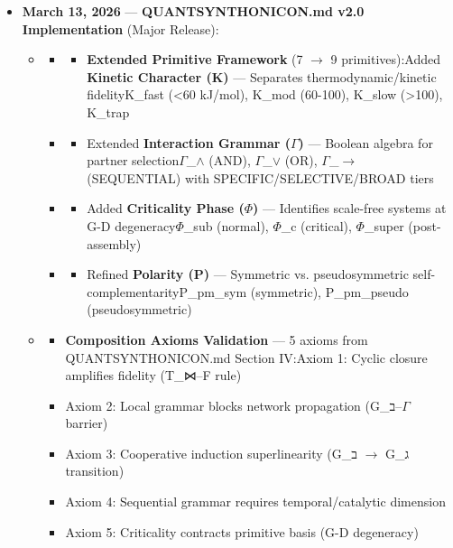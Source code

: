 \documentclass[12pt,a4paper]{article}
\begin{document}
\begin{itemize}
\begin{itemize}
\end{itemize}

    \item 
    \textbf{March 13, 2026} --- \textbf{QUANTSYNTHONICON.md v2.0 Implementation} (Major Release):

    \begin{itemize}
    \item 
    \begin{itemize}
    \item 
    \begin{itemize}
    \item \textbf{Extended Primitive Framework} (7 $\rightarrow$ 9 primitives):Added \textbf{Kinetic Character (K)} --- Separates thermodynamic/kinetic fidelityK\_fast (\textless{}60 kJ/mol), K\_mod (60-100), K\_slow (\textgreater{}100), K\_trap
\end{itemize}

    \item 
    \begin{itemize}
    \item Extended \textbf{Interaction Grammar ($\Gamma$)} --- Boolean algebra for partner selection$\Gamma$\_$\land$ (AND), $\Gamma$\_$\lor$ (OR), $\Gamma$\_$\rightarrow$ (SEQUENTIAL) with SPECIFIC/SELECTIVE/BROAD tiers
\end{itemize}

    \item 
    \begin{itemize}
    \item Added \textbf{Criticality Phase ($\Phi$)} --- Identifies scale-free systems at G-D degeneracy$\Phi$\_sub (normal), $\Phi$\_c (critical), $\Phi$\_super (post-assembly)
\end{itemize}

    \item 
    \begin{itemize}
    \item Refined \textbf{Polarity (P)} --- Symmetric vs. pseudosymmetric self-complementarityP\_pm\_sym (symmetric), P\_pm\_pseudo (pseudosymmetric)
\end{itemize}

\end{itemize}

    \item 
    \begin{itemize}
    \item \textbf{Composition Axioms Validation} --- 5 axioms from QUANTSYNTHONICON.md Section IV:Axiom 1: Cyclic closure amplifies fidelity (T\_⋈--F rule)
    \item Axiom 2: Local grammar blocks network propagation (G\_ב--$\Gamma$ barrier)
    \item Axiom 3: Cooperative induction superlinearity (G\_ב $\rightarrow$ G\_ג transition)
    \item Axiom 4: Sequential grammar requires temporal/catalytic dimension
    \item Axiom 5: Criticality contracts primitive basis (G-D degeneracy)
\end{itemize}


\end{itemize}
\end{itemize}
\end{document}
